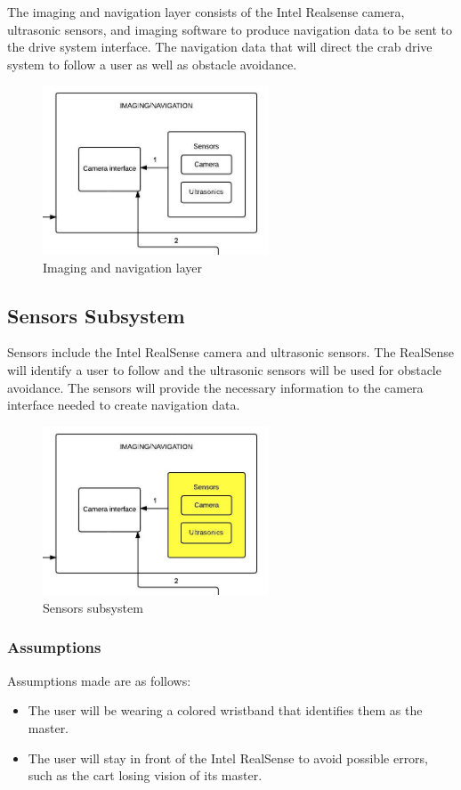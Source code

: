 The imaging and navigation layer consists of the Intel Realsense camera, ultrasonic sensors, and imaging software to produce navigation data to be sent to the drive system interface. The navigation data that will direct the crab drive system to follow a user as well as obstacle avoidance.

\begin{figure}[h!]
	\centering
 	\includegraphics[width=0.60\textwidth]{images/imaging}
 \caption{Imaging and navigation layer}
\end{figure}

\subsection{Sensors Subsystem}
Sensors include the Intel RealSense camera and ultrasonic sensors. The RealSense will identify a user to follow and the ultrasonic sensors will be used for obstacle avoidance. The sensors will provide the necessary information to the camera interface needed to create navigation data.

\begin{figure}[h!]
	\centering
 	\includegraphics[width=0.60\textwidth]{images/imaging_sensors}
 \caption{Sensors subsystem}
\end{figure}

\subsubsection{Assumptions}
Assumptions made are as follows:
\begin{itemize}
	\item The user will be wearing a colored wristband that identifies them as the master.
	\item The user will stay in front of the Intel RealSense to avoid possible errors, such as the cart losing vision of its master.
\end{itemize}


